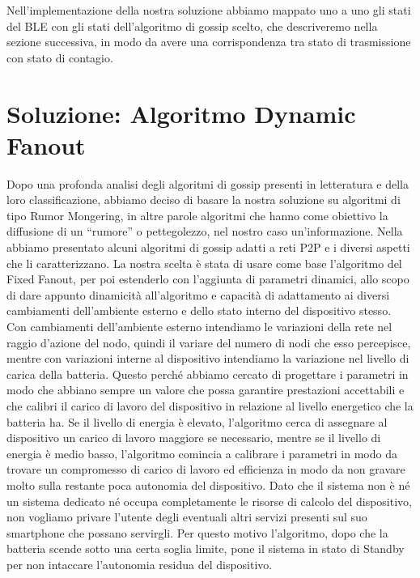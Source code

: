 Nell'implementazione della nostra soluzione abbiamo mappato uno a uno gli stati del \acs{BLE} con gli stati dell'algoritmo di gossip scelto, che descriveremo nella sezione successiva, in modo da avere una corrispondenza tra stato di trasmissione con stato di contagio.
\bigskip

\section{Soluzione: Algoritmo Dynamic Fanout}
Dopo una profonda analisi degli algoritmi di gossip presenti in letteratura e della loro classificazione, abbiamo deciso di basare la nostra soluzione su algoritmi di tipo Rumor Mongering, in altre parole algoritmi che hanno come obiettivo la diffusione di un “rumore” o pettegolezzo, nel nostro caso un'informazione. Nella  abbiamo presentato alcuni algoritmi di gossip adatti a reti \acs{P2P} e i diversi aspetti che li caratterizzano. La nostra scelta è stata di usare come base l'algoritmo del Fixed Fanout, per poi estenderlo con l'aggiunta di parametri dinamici, allo scopo di dare appunto dinamicità all'algoritmo e capacità di adattamento ai diversi cambiamenti dell'ambiente esterno e dello stato interno del dispositivo stesso. Con cambiamenti dell'ambiente esterno intendiamo le variazioni della rete nel raggio d'azione del nodo, quindi il variare del numero di nodi che esso percepisce, mentre con variazioni interne al dispositivo intendiamo la variazione nel livello di carica della batteria. Questo perché abbiamo cercato di progettare i parametri in modo che abbiano sempre un valore che possa garantire prestazioni accettabili e che calibri il carico di lavoro del dispositivo in relazione al livello energetico che la batteria ha. Se il livello di energia è elevato, l'algoritmo cerca di assegnare al dispositivo un carico di lavoro maggiore se necessario, mentre se il livello di energia è medio basso, l'algoritmo comincia a calibrare i parametri in modo da trovare un compromesso di carico di lavoro ed efficienza in modo da non gravare molto sulla restante poca autonomia del dispositivo. Dato che il sistema non è né un sistema dedicato né occupa completamente le risorse di calcolo del dispositivo, non vogliamo privare l'utente degli eventuali altri servizi presenti sul suo smartphone che possano servirgli. Per questo motivo l'algoritmo, dopo che la batteria scende sotto una certa soglia limite, pone il sistema in stato di Standby per non intaccare l'autonomia residua del dispositivo.

